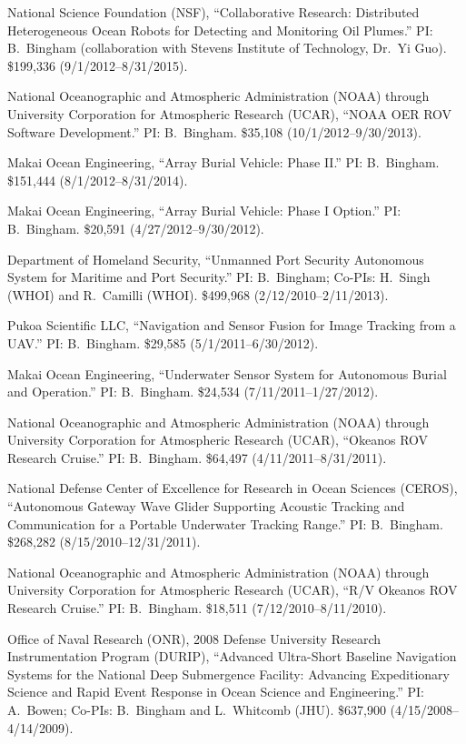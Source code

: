 \begin{cvenum}
  \item National Science Foundation (NSF), ``Collaborative Research: Distributed Heterogeneous Ocean Robots for Detecting and Monitoring Oil Plumes.'' PI: B.\ Bingham (collaboration with Stevens Institute of Technology, Dr.\ Yi Guo). \$199,336 (9/1/2012--8/31/2015).
  \item National Oceanographic and Atmospheric Administration (NOAA) through University Corporation for Atmospheric Research (UCAR), ``NOAA OER ROV Software Development.'' PI: B.\ Bingham. \$35,108 (10/1/2012--9/30/2013).
  \item Makai Ocean Engineering, ``Array Burial Vehicle: Phase II.'' PI: B.\ Bingham. \$151,444 (8/1/2012--8/31/2014).
  \item Makai Ocean Engineering, ``Array Burial Vehicle: Phase I Option.'' PI: B.\ Bingham. \$20,591 (4/27/2012--9/30/2012).
  \item Department of Homeland Security, ``Unmanned Port Security Autonomous System for Maritime and Port Security.'' PI: B.\ Bingham; Co-PIs: H.\ Singh (WHOI) and R.\ Camilli (WHOI). \$499,968 (2/12/2010--2/11/2013).
  \item Pukoa Scientific LLC, ``Navigation and Sensor Fusion for Image Tracking from a UAV.'' PI: B.\ Bingham. \$29,585 (5/1/2011--6/30/2012).
  \item Makai Ocean Engineering, ``Underwater Sensor System for Autonomous Burial and Operation.'' PI: B.\ Bingham. \$24,534 (7/11/2011--1/27/2012).
  \item National Oceanographic and Atmospheric Administration (NOAA) through University Corporation for Atmospheric Research (UCAR), ``Okeanos ROV Research Cruise.'' PI: B.\ Bingham. \$64,497 (4/11/2011--8/31/2011).
  \item National Defense Center of Excellence for Research in Ocean Sciences (CEROS), ``Autonomous Gateway Wave Glider Supporting Acoustic Tracking and Communication for a Portable Underwater Tracking Range.'' PI: B.\ Bingham. \$268,282 (8/15/2010--12/31/2011).
  \item National Oceanographic and Atmospheric Administration (NOAA) through University Corporation for Atmospheric Research (UCAR), ``R/V Okeanos ROV Research Cruise.'' PI: B.\ Bingham. \$18,511 (7/12/2010--8/11/2010).
  \item Office of Naval Research (ONR), 2008 Defense University Research Instrumentation Program (DURIP), ``Advanced Ultra-Short Baseline Navigation Systems for the National Deep Submergence Facility: Advancing Expeditionary Science and Rapid Event Response in Ocean Science and Engineering.'' PI: A.\ Bowen; Co-PIs: B.\ Bingham and L.\ Whitcomb (JHU). \$637,900 (4/15/2008--4/14/2009).

\end{cvenum}
